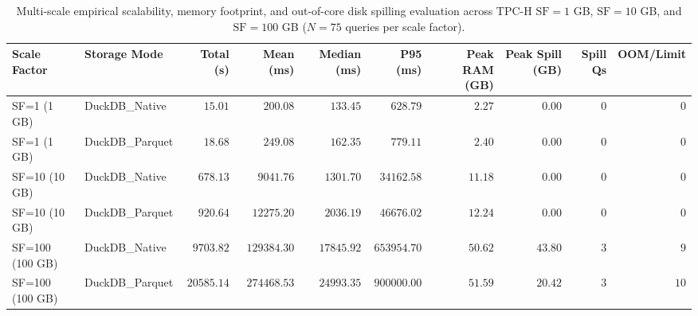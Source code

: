 \begin{table}[htbp]
\centering
\scriptsize
\setlength{\tabcolsep}{4.2pt}
\caption{Multi-scale empirical scalability, memory footprint, and out-of-core disk spilling evaluation across TPC-H $\text{SF}=1$ GB, $\text{SF}=10$ GB, and $\text{SF}=100$ GB ($N=75$ queries per scale factor).}
\label{tab:multiscale_scalability}
\begin{tabular}{@{}llrrrrrrrr@{}}
\toprule
\textbf{Scale Factor} & \textbf{Storage Mode} & \textbf{Total (s)} & \textbf{Mean (ms)} & \textbf{Median (ms)} & \textbf{P95 (ms)} & \textbf{Peak RAM (GB)} & \textbf{Peak Spill (GB)} & \textbf{Spill Qs} & \textbf{OOM/Limit} \\
\midrule
SF=1 (1 GB) & DuckDB\_Native & $15.01$ & $200.08$ & $133.45$ & $628.79$ & $2.27$ & $0.00$ & $0$ & $0$ \\
SF=1 (1 GB) & DuckDB\_Parquet & $18.68$ & $249.08$ & $162.35$ & $779.11$ & $2.40$ & $0.00$ & $0$ & $0$ \\
SF=10 (10 GB) & DuckDB\_Native & $678.13$ & $9041.76$ & $1301.70$ & $34162.58$ & $11.18$ & $0.00$ & $0$ & $0$ \\
SF=10 (10 GB) & DuckDB\_Parquet & $920.64$ & $12275.20$ & $2036.19$ & $46676.02$ & $12.24$ & $0.00$ & $0$ & $0$ \\
SF=100 (100 GB) & DuckDB\_Native & $9703.82$ & $129384.30$ & $17845.92$ & $653954.70$ & $50.62$ & $43.80$ & $3$ & $9$ \\
SF=100 (100 GB) & DuckDB\_Parquet & $20585.14$ & $274468.53$ & $24993.35$ & $900000.00$ & $51.59$ & $20.42$ & $3$ & $10$ \\
\bottomrule
\end{tabular}
\end{table}